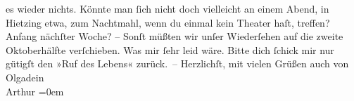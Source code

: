 \begin{ledgroupsized}[t]{13cm}
               es wieder nichts. Könnte man ſich nicht doch vielleicht an einem Abend, in Hietzing etwa, zum Nachtmahl, wenn du einmal kein
               Theater haſt, treffen? Anfang nächſter Woche? – Sonſt müßten wir {\pb}unſer Wiederſehen auf
               die zweite Oktoberhälfte verſchieben. Was mir ſehr leid wäre.\pend
           \pstart
           Bitte dich ſchick mir nur gütigſt den »Ruf des
                  Lebens« zurück. –\pend
           \pstart
           Herzlichſt, mit vielen Grüßen auch von Olgadein{\\[\baselineskip]}\spacefill\mbox{Arthur}\pend
           \leftskip=0em{}
         
         \endnumbering{}\end{ledgroupsized}  \newcommand{\dateiname}{L01552}\newcommand{\titel}{Arthur Schnitzler an Hermann Bahr, 28. 9. 1905}\newcommand{\editorInnen}{ Kurt Ifkovits, Martin Anton Müller}
      